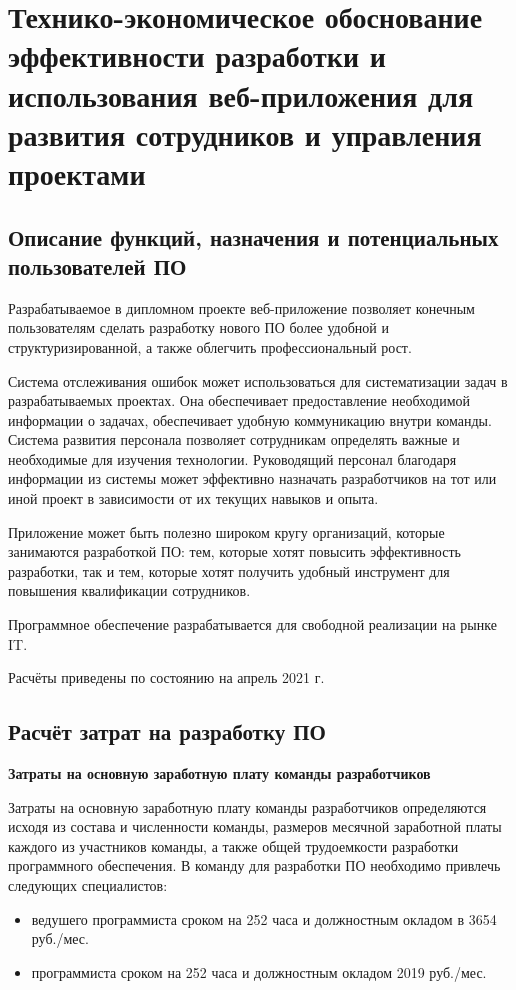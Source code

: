\section{Технико-экономическое обоснование эффективности разработки и использования веб-приложения для развития сотрудников и управления проектами}\label{sec:economics}

\subsection{Описание функций, назначения и потенциальных пользователей ПО}

Разрабатываемое в дипломном проекте веб-приложение позволяет конечным пользователям сделать разработку нового ПО более удобной и структуризированной, а также облегчить профессиональный рост. 

Система отслеживания ошибок может использоваться для систематизации задач в разрабатываемых проектах. Она обеспечивает предоставление необходимой информации о задачах, обеспечивает удобную коммуникацию внутри команды. Система развития персонала позволяет сотрудникам определять важные и необходимые для изучения технологии. Руководящий персонал благодаря информации из системы может эффективно назначать разработчиков на тот или иной проект в зависимости от их текущих навыков и опыта.

Приложение может быть полезно широком кругу организаций, которые занимаются разработкой ПО: тем, которые хотят повысить эффективность разработки, так и тем, которые хотят получить удобный инструмент для повышения квалификации сотрудников.

Программное обеспечение разрабатывается для свободной реализации на рынке IT.

Расчёты приведены по состоянию на апрель 2021 г.

\subsection{Расчёт затрат на разработку ПО}

\textbf{Затраты на основную заработную плату команды разработчиков}

Затраты на основную заработную плату команды разработчиков определяются исходя из состава и численности команды, размеров месячной заработной платы каждого из участников команды, а также общей трудоемкости разработки программного обеспечения. В команду для разработки ПО необходимо привлечь следующих специалистов:
\begin{itemize}
    \item ведушего программиста сроком на 252 часа и должностным окладом в 3654 руб./мес.
    \item программиста сроком на 252 часа и должностным окладом 2019 руб./мес.
\end{itemize}


